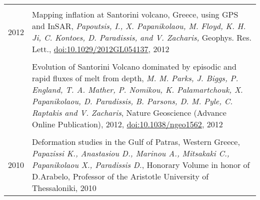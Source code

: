 \documentclass[9pt]{extarticle} %
\begin{document}
\begin{longtable}{r|p{14cm}}
%
\multicolumn{2}{c}{} \\ 
  \textsc{2012}
  & Mapping inflation at Santorini volcano, Greece, using GPS and InSAR,
  \emph{Papoutsis, I., X. Papanikolaou, M. Floyd, K. H. Ji, C. Kontoes, D. Paradissis, and V. Zacharis,}
  Geophys. Res. Lett., \href{http://www.agu.org/pubs/crossref/pip/2012GL054137.shtml}{doi:10.1029/2012GL054137}, 2012\\
%
  &\\
%
  & Evolution of Santorini Volcano dominated by episodic and rapid fluxes of melt from depth,
  \emph{M. M. Parks, J. Biggs, P. England, T. A. Mather, P. Nomikou, K. Palamartchouk, X. Papanikolaou, D. Paradissis, B. Parsons, D. M. Pyle, C. Raptakis and V. Zacharis},
  Nature Geoscience (Advance Online Publication), 2012, \href{http://www.nature.com/ngeo/journal/v5/n10/full/ngeo1562.html}{doi:10.1038/ngeo1562}, 2012\\
%
\multicolumn{2}{c}{} \\ 
  \textsc{2010}
  & Deformation studies in the Gulf of Patras, Western Greece,
  \emph{Papazissi K., Anastasiou D., Marinou A., Mitsakaki C., Papanikolaou X., Paradissis D.}, 
  Honorary Volume in honor of D.Arabelo, Professor of the Aristotle University of Thessaloniki, 2010\\
\end{longtable}
%
\end{document}
